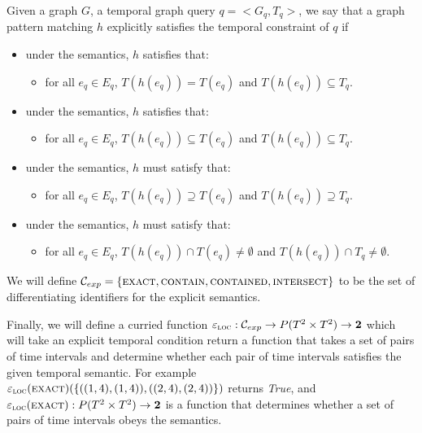 \begin{defn}
\label{explicit-temp-semantics}
Given a graph $G$, a temporal graph query $q= <G_q, T_q>$, we say that a graph
pattern matching $h$ explicitly satisfies the temporal constraint of $q$ if
\begin{itemize}
	\item under the \exact{} semantics, $h$ satisfies that:
	\begin{itemize}
		\item for all $e_q \in E_q$, $T(h(e_q)) = T(e_q)$ and $T(h(e_q))
                  \subseteq T_q$.
	\end{itemize}

	\item under the \contain{} semantics, $h$ satisfies that:
	\begin{itemize}
		\item for all $e_q \in E_q$, $T(h(e_q)) \subseteq T(e_q)$ and
                  $T(h(e_q)) \subseteq T_q$.
	\end{itemize}

	\item under the \contained{} semantics, $h$ must satisfy that:
	\begin{itemize}
		\item for all $e_q \in E_q$, $T(h(e_q)) \supseteq T(e_q)$ and
                  $T(h(e_q)) \supseteq T_q$.
	\end{itemize}

	\item under the \intersection{} semantics, $h$ must satisfy that:
	\begin{itemize}
		\item for all $e_q \in E_q$, $T(h(e_q)) \cap T(e_q) \not=
                  \emptyset $ and $T(h(e_q)) \cap T_q \not= \emptyset$.
	\end{itemize}
\end{itemize}



  We will define $\mathcal{C}_{exp} = \{\textsc{exact}, \textsc{contain}, \textsc{contained}, \textsc{intersect}\}$ to
  be the set of differentiating identifiers for the explicit semantics.

  Finally, we will define a curried function $\varepsilon_{\textsc{loc}} : \mathcal{C}_{exp} \to P(T^2
  \times T^2) \to \textbf{2}$ which will take an explicit temporal condition
  return a function that takes a set of pairs of time intervals and determine
  whether each pair of time intervals satisfies the given temporal semantic. For
  example $\varepsilon_{\textsc{loc}}(\textsc{exact})(\{((1,4),(1,4)), ((2,4),(2,4)) \})$ returns
  \emph{True}, and $\varepsilon_{\textsc{loc}}(\textsc{exact}): P(T^2 \times T^2) \to \textbf{2}$ is a
  function that determines whether a set of pairs of time intervals obeys the
  \exact{} semantics.

\end{defn}

